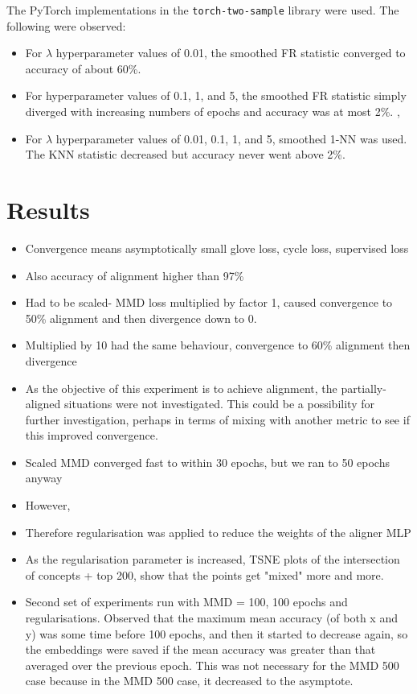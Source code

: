 The PyTorch implementations in the \texttt{torch-two-sample} library  were used. The following were observed:

\begin{itemize}
    \item For $\lambda$ hyperparameter values of 0.01, the smoothed FR statistic converged to accuracy of about 60\%. 
    \item For hyperparameter values of 0.1, 1, and 5, the smoothed FR statistic simply diverged with increasing numbers of epochs and accuracy was at most 2\%.  , 
    \item For $\lambda$ hyperparameter values of 0.01, 0.1, 1, and 5, smoothed 1-NN was used. The KNN statistic decreased but accuracy never went above 2\%.
\end{itemize}


    
\section{Results}
\begin{itemize}
    \item Convergence means asymptotically small glove loss, cycle loss, supervised loss
    \item Also accuracy of alignment higher than 97\%
    \item Had to be scaled- MMD loss multiplied by factor 1, caused convergence to 50\% alignment and then divergence down to 0.
    \item Multiplied by 10 had the same behaviour, convergence to 60\% alignment then divergence
    \item As the objective of this experiment is to achieve alignment, the partially-aligned situations were not investigated. This could be a possibility for further investigation, perhaps in terms of mixing with another metric to see if this improved convergence. 
    \item Scaled MMD converged fast to within 30 epochs, but we ran to 50 epochs anyway
    \item However, 
    \item Therefore regularisation was applied to reduce the weights of the aligner MLP 
    \item As the regularisation parameter is increased, TSNE plots of the intersection of concepts + top 200, show that the points get "mixed" more and more. 
    \item Second set of experiments run with MMD = 100, 100 epochs and regularisations. Observed that the maximum mean accuracy (of both x and y) was some time before 100 epochs, and then it started to decrease again, so the embeddings were saved if the mean accuracy was greater than that averaged over the previous epoch. This was not necessary for the MMD 500 case because in the MMD 500 case, it decreased to the asymptote. 
\end{itemize}